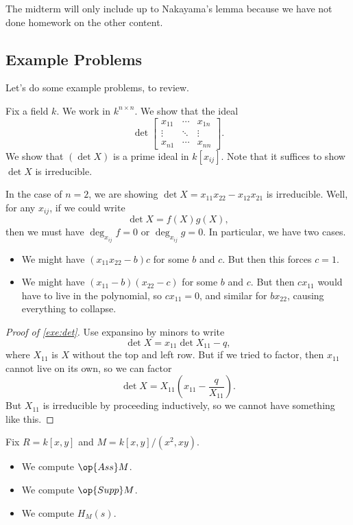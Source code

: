 \begin{remark}
	The midterm will only include up to Nakayama's lemma because we have not done homework on the other content.
\end{remark}

\subsection{Example Problems}
Let's do some example problems, to review.
\begin{exe} \label{exe:det}
	Fix a field $k$. We work in $k^{n\times n}$. We show that the ideal
	\[\det\begin{bmatrix}
		x_{11} & \cdots & x_{1n} \\
		\vdots & \ddots & \vdots \\
		x_{n1} & \cdots & x_{nn}
	\end{bmatrix}.\]
	We show that $(\det X)$ is a prime ideal in $k[x_{ij}]$. Note that it suffices to show $\det X$ is irreducible.
\end{exe}
\begin{ex}
	In the case of $n=2$, we are showing $\det X=x_{11}x_{22}-x_{12}x_{21}$ is irreducible. Well, for any $x_{ij}$, if we could write
	\[\det X=f(X)g(X),\]
	then we must have $\deg_{x_{ij}}f=0$ or $\deg_{x_{ij}}g=0$. In particular, we have two cases.
	\begin{itemize}
		\item We might have $(x_{11}x_{22}-b)c$ for some $b$ and $c$. But then this forces $c=1$.
		\item We might have $(x_{11}-b)(x_{22}-c)$ for some $b$ and $c$. But then $cx_{11}$ would have to live in the polynomial, so $cx_{11}=0$, and similar for $bx_{22}$, causing everything to collapse.
	\end{itemize}
\end{ex}
\begin{proof}[Proof of \autoref{exe:det}]
	Use expansino by minors to write
	\[\det X=x_{11}\det X_{11}-q,\]
	where $X_{11}$ is $X$ without the top and left row. But if we tried to factor, then $x_{11}$ cannot live on its own, so we can factor
	\[\det X=X_{11}\left(x_{11}-\frac q{X_{11}}\right).\]
	But $X_{11}$ is irreducible by proceeding inductively, so we cannot have something like this. %
\end{proof}
\begin{exe}
	Fix $R=k[x,y]$ and $M=k[x,y]/\left(x^2,xy\right)$.
	\begin{itemize}
		\item We compute $\op{Ass}M$.
		\item We compute $\op{Supp}M$.
		\item We compute $H_M(s)$.
	\end{itemize}
\end{exe}
